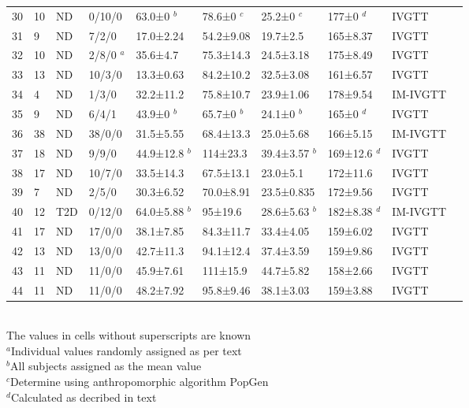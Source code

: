 \documentclass[utf8]{frontiersSCNS} %
\begin{document}
\begin{table}[h]
{\begin{tabular}{llllllllll}
30 & 10 & ND & 0/10/0  & 63.0±0 $^b$      & 78.6±0 $^c$  & 25.2±0 $^c$    & 177±0 $^d$    & IVGTT    & \citet{1998_AGING_Ahren}         \\
31 & 9  & ND & 7/2/0   & 17.0±2.24     & 54.2±9.08 & 19.7±2.5    & 165±8.37   & IVGTT   & \citet{pagano_1995}                      \\
32 & 10 & ND & 2/8/0 $^a$ & 35.6±4.7    & 75.3±14.3 & 24.5±3.18   & 175±8.49   & IVGTT    & \citet{2001_MyocInfarct_Cavallo} \\
33 & 13 & ND & 10/3/0  & 13.3±0.63   & 84.2±10.2 & 32.5±3.08   & 161±6.57   & IVGTT    & \citet{Cerutti1998}                      \\
34 & 4  & ND & 1/3/0   & 32.2±11.2   & 75.8±10.7 & 23.9±1.06   & 178±9.54   & IM-IVGTT & \citet{2002_AGENESIS_Roden}      \\
35 & 9  & ND & 6/4/1   & 43.9±0 $^b$    & 65.7±0 $^b$  & 24.1±0 $^b$    & 165±0 $^d$    & IVGTT & \citet{2008_hanisurya_thyroid} \\
36 & 38 & ND & 38/0/0  & 31.5±5.55   & 68.4±13.3 & 25.0±5.68     & 166±5.15   & IM-IVGTT & \citet{2012_pGDM_tura}           \\
37 & 18 & ND & 9/9/0   & 44.9±12.8 $^b$ & 114±23.3  & 39.4±3.57 $^b$ & 169±12.6 $^d$ & IVGTT    & \cite{Kautzky-Willer1992} \\
38 & 17 & ND & 10/7/0  & 33.5±14.3   & 67.5±13.1 & 23.0±5.1      & 172±11.6   & IVGTT    & \citet{Kautzky-Willer1992}     \\
39 & 7  & ND & 2/5/0   & 30.3±6.52   & 70.0±8.91   & 23.5±0.835  & 172±9.56   & IVGTT    & \citet{alex_1996}                     \\
40 & 12 & T2D & 0/12/0  & 64.0±5.88 $^b$   & 95±19.6   & 28.6±5.63 $^b$ & 182±8.38 $^d$ & IM-IVGTT & \citet{2010_alcohol_ludvik}      \\
41 & 17 & ND & 17/0/0  & 38.1±7.85   & 84.3±11.7 & 33.4±4.05   & 159±6.02   & IVGTT     & \citet{2006_Davi_JACC}           \\
42 & 13 & ND & 13/0/0  & 42.7±11.3   & 94.1±12.4 & 37.4±3.59   & 159±9.86   & IVGTT    & \citet{2006_Davi_JACC}           \\
43 & 11 & ND & 11/0/0  & 45.9±7.61   & 111±15.9  & 44.7±5.82   & 158±2.66   & IVGTT    & \citet{2003_INFLAMMATORY_Davi}   \\
44 & 11 & ND & 11/0/0  & 48.2±7.92   & 95.8±9.46 & 38.1±3.03   & 159±3.88   & IVGTT    & \citet{2003_INFLAMMATORY_Davi}  \\ \hline
\end{tabular}}
\\
The values in cells without superscripts are known \\ 
$^a$Individual values randomly assigned as per text\\
$^b$All subjects assigned as the mean value \\
$^c$Determine using anthropomorphic algorithm PopGen \\
$^d$Calculated as decribed in text \\
\end{table}
\end{document}
